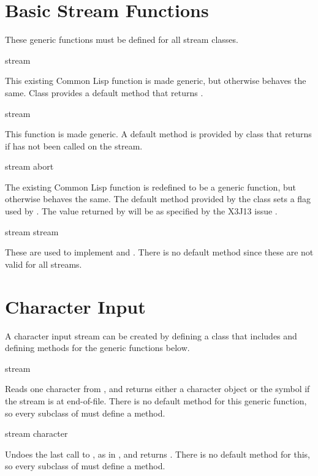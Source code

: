 \section {Basic Stream Functions}

These generic functions must be defined for all stream classes.

 {stream}

This existing Common Lisp function is made generic, but otherwise behaves the
same.  Class  provides a default method that
returns .

 {stream}

This function is made generic.  A default method is provided by class
 that returns  if  has not been
called on the stream.

 {stream \key abort}

The existing Common Lisp function  is redefined to be a generic
function, but otherwise behaves the same.  The default method provided by the
class  sets a flag used by .  The value
returned by  will be as specified by the X3J13 issue
.

 {stream}
 {stream}

These are used to implement  and .  There is no
default method since these are not valid for all streams.


\section {Character Input}

A character input stream can be created by defining a class that includes
 and defining methods for the generic
functions below.

 {stream}

Reads one character from , and returns either a character object or
the symbol  if the stream is at end-of-file.  There is no default
method for this generic function, so every subclass of
 must define a method.

 {stream character}

Undoes the last call to , as in , and
returns .  There is no default method for this, so every subclass of
 must define a method.

